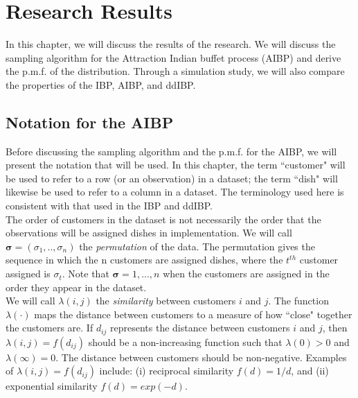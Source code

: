\chapter{Research Results}
In this chapter, we will discuss the results of the research. We will discuss
the sampling algorithm for the Attraction Indian buffet process (AIBP) and
derive the p.m.f. of the distribution. Through a simulation study, we will also
compare the properties of the IBP, AIBP, and ddIBP.\\

\section{Notation for the AIBP}
Before discussing the sampling algorithm and the p.m.f. for the AIBP,  we will
present the notation that will be used. In this chapter, the term ``customer"
will be used to refer to a row (or an observation) in a dataset; the term ``dish"
will likewise be used to refer to a column in a dataset. The terminology used
here is consistent with that used in the IBP and ddIBP.\\

\noindent
The order of customers in the dataset is not necessarily the order that the
observations will be assigned dishes in implementation. We will call $\bm
\sigma = (\sigma_1,..,\sigma_n)$ the \textit{permutation} of the
data. The permutation gives the sequence in which the n customers are assigned
dishes, where the $t^{th}$ customer assigned is $\sigma_t$. Note that $\bm
\sigma = {1,...,n}$ when the customers are assigned in the order they appear
in the dataset.\\

\noindent
We will call $\lambda(i,j)$ the \textit{similarity} between customers $i$ and
$j$. The function $\lambda(\cdot)$ maps the distance between customers to a
measure of how ``close" together the customers are. If $d_{ij}$ represents the
distance between customers $i$ and $j$, then $\lambda(i,j)=f(d_{ij})$ should be
a non-increasing function such that $\lambda(0)>0$ and $\lambda(\infty)=0$. The
distance between customers should be non-negative. Examples of
$\lambda(i,j)=f(d_{ij})$ include: (i) reciprocal similarity $f(d) = 1/d$, and
(ii) exponential similarity $f(d) = exp(-d)$.\\

